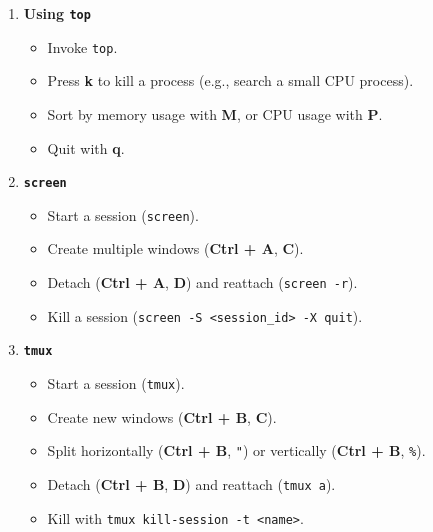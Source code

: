 \documentclass[a4paper]{report}
\begin{document}
\begin{enumerate}
        \item \textbf{Using \texttt{top}}
        \begin{itemize}
            \item Invoke \texttt{top}.
            \item Press \textbf{k} to kill a process (e.g., search a small CPU process).
            \item Sort by memory usage with \textbf{M}, or CPU usage with \textbf{P}.
            \item Quit with \textbf{q}.
        \end{itemize}
    
        \item \textbf{\texttt{screen}}
        \begin{itemize}
            \item Start a session (\texttt{screen}).
            \item Create multiple windows (\textbf{Ctrl + A}, \textbf{C}).
            \item Detach (\textbf{Ctrl + A}, \textbf{D}) and reattach (\texttt{screen -r}).
            \item Kill a session (\texttt{screen -S <session\_id> -X quit}).
        \end{itemize}
    
        \item \textbf{\texttt{tmux}}
        \begin{itemize}
            \item Start a session (\texttt{tmux}).
            \item Create new windows (\textbf{Ctrl + B}, \textbf{C}).
            \item Split horizontally (\textbf{Ctrl + B}, \texttt{"}) or vertically (\textbf{Ctrl + B}, \texttt{\%}).
            \item Detach (\textbf{Ctrl + B}, \textbf{D}) and reattach (\texttt{tmux a}).
            \item Kill with \texttt{tmux kill-session -t <name>}.
        \end{itemize}
    \end{enumerate}
    
\end{document}

